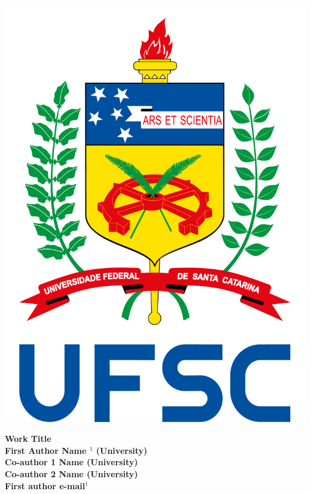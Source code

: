 \documentclass[a0,portrait]{a0poster}
\renewcommand{\LARGE}{\fontsize{50}{70}\selectfont\bfseries} %
\renewcommand{\large}{\fontsize{40}{50}\selectfont\bfseries}
\renewcommand{\huge}{\fontsize{70}{80}\selectfont\bfseries} %
\begin{document}
\begin{center}
\parbox{0.2\textwidth}{
\begin{center}
\hspace{10cm}
\includegraphics[scale=0.225]{brasao_UFSC.png}
\end{center}}
\parbox{0.40\textwidth}{
\begin{center}
\textrm{{\huge {\color{myblue} \textbf{
			Work Title}}}\\[1ex]
\bigskip
{\LARGE First Author Name $^1$ (University)}\\[1ex]
{\LARGE Co-author 1 Name (University)\\ 
	\vspace{0.2cm} Co-author 2  Name (University)}\\[1ex]
{\large First author e-mail$^1$}}\\[1ex]
\end{center}
}
\parbox{0.3\textwidth}{
\begin{center}

\end{center}}
\end{center}
\end{document}
